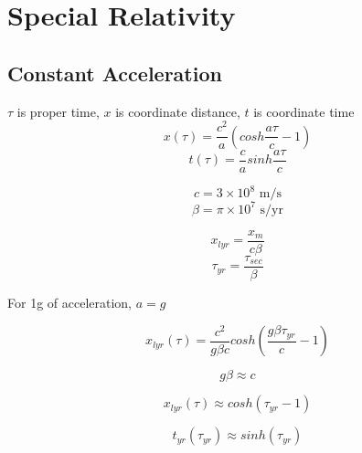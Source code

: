 \section{Special Relativity}

\subsection{Constant Acceleration}
$\tau$ is proper time, $x$ is coordinate distance, $t$ is coordinate time
\begin{equation}
	x(\tau) = \frac{c^2}{a} \left( cosh \frac{a \tau}{c} - 1 \right) 
\end{equation}
\begin{equation}
t(\tau) = \frac{c}{a} sinh \frac{a \tau}{c}
\end{equation}

\begin{equation}
	c = 3 \times 10^8 \text{  m/s}
\end{equation}
\begin{equation}
	\beta = \pi \times 10^7 \text{  s/yr}
\end{equation}

\begin{equation}
x_{lyr} = \frac{x_m}{c \beta}
\end{equation}
\begin{equation}
\tau_{yr} = \frac{\tau_{sec}}{\beta} 
\end{equation}

For 1g of acceleration, $a = g$

\begin{equation}
	x_{lyr}(\tau) = \frac{c^2}{g \beta c} cosh \left(\frac{g \beta \tau_{yr}}{c} - 1\right)
\end{equation}

\begin{equation}
	g\beta \approx c
\end{equation}

\begin{equation}
	x_{lyr}(\tau) \approx cosh \left( \tau_{yr} - 1\right)
\end{equation}

\begin{equation}
	t_{yr}(\tau_{yr}) \approx sinh \left( \tau_{yr} \right)
\end{equation}